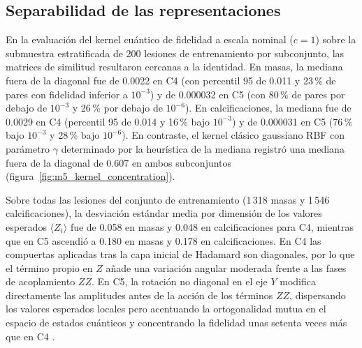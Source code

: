
\subsection{Separabilidad de las representaciones}
\label{sec:separabilidad_representaciones}

En la evaluación del kernel cuántico de fidelidad a escala nominal ($c = 1$) sobre la submuestra
estratificada de 200 lesiones de entrenamiento por subconjunto, las matrices de similitud resultaron
cercanas a la identidad. En masas, la mediana fuera de la diagonal fue de 0.0022 en C4 (con percentil 95
de 0.011 y 23\,\% de pares con fidelidad inferior a $10^{-3}$) y de 0.000032 en C5 (con 80\,\% de pares
por debajo de $10^{-3}$ y 26\,\% por debajo de $10^{-6}$). En calcificaciones, la mediana fue de 0.0029
en C4 (percentil 95 de 0.014 y 16\,\% bajo $10^{-3}$) y de 0.000031 en C5 (76\,\% bajo $10^{-3}$ y 28\,\%
bajo $10^{-6}$). En contraste, el kernel clásico gaussiano RBF con parámetro $\gamma$ determinado por la
heurística de la mediana registró una mediana fuera de la diagonal de 0.607 en ambos subconjuntos (figura~\ref{fig:m5_kernel_concentration}).

Sobre todas las lesiones del conjunto de entrenamiento (1\,318 masas y 1\,546 calcificaciones),
la desviación estándar media por dimensión de los valores esperados $\langle Z_i \rangle$ fue de 0.058
en masas y 0.048 en calcificaciones para C4, mientras que en C5 ascendió a 0.180 en masas y 0.178 en
calcificaciones. En C4 las compuertas aplicadas tras la capa inicial de Hadamard son diagonales, por lo
que el término propio en $Z$ añade una variación angular moderada frente a las fases de acoplamiento $ZZ$.
En C5, la rotación no diagonal en el eje $Y$ modifica directamente las amplitudes antes de la acción de
los términos $ZZ$, dispersando los valores esperados locales pero acentuando la ortogonalidad mutua en el
espacio de estados cuánticos y concentrando la fidelidad unas setenta veces más que en C4 \cite{Thanasilp2024}.

